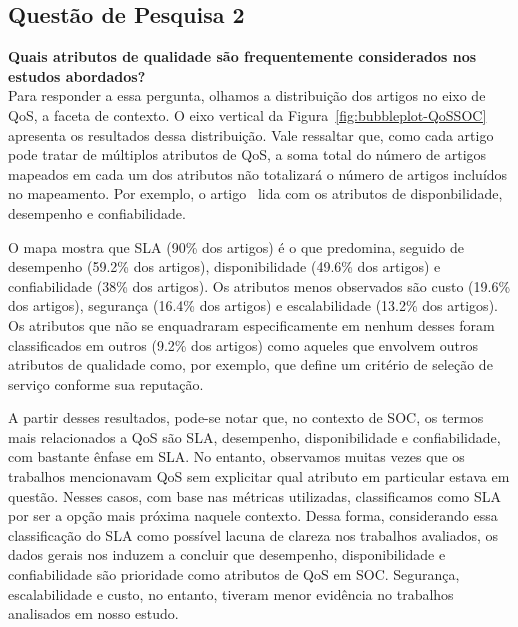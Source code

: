 \subsection{Quest\~{a}o de Pesquisa 2}
\textbf{Quais atributos de qualidade são frequentemente considerados nos estudos abordados?}
\\[0.01in]

Para responder a essa pergunta, olhamos a distribui\c{c}\~{a}o dos artigos no eixo de QoS, a faceta de contexto. O eixo vertical da Figura~\ref{fig:bubbleplot-QoSSOC} apresenta os resultados dessa distribui\c{c}\~{a}o. Vale ressaltar que, como cada artigo pode tratar de m\'{u}ltiplos atributos de QoS, a soma total do n\'{u}mero de artigos mapeados em cada um dos atributos n\~{a}o totalizar\'{a} o n\'{u}mero de artigos inclu\'{i}dos no mapeamento. Por exemplo, o artigo~\cite{DBLP:journals/tse/CalinescuGKMT11} lida com os atributos de disponbilidade, desempenho e confiabilidade. 

O mapa mostra que SLA (90\% dos artigos) \'{e} o que predomina, seguido de desempenho (59.2\% dos artigos), disponibilidade (49.6\% dos artigos) e confiabilidade (38\% dos artigos). Os atributos menos observados s\~{a}o custo (19.6\% dos artigos), seguran\c{c}a (16.4\% dos artigos) e escalabilidade (13.2\% dos artigos). Os atributos que n\~{a}o se enquadraram especificamente em nenhum desses foram classificados em outros (9.2\% dos artigos) como aqueles que envolvem outros atributos de qualidade como, por exemplo, \cite{6036406} que define um crit\'{e}rio de sele\c{c}\~{a}o de servi\c{c}o conforme sua reputa\c{c}\~{a}o. 

A partir desses resultados, pode-se notar que, no contexto de SOC, os termos mais relacionados a QoS s\~{a}o SLA, desempenho, disponibilidade e confiabilidade, com bastante \^{e}nfase em SLA. No entanto, observamos muitas vezes que os trabalhos mencionavam QoS sem explicitar qual atributo em particular estava em quest\~{a}o. Nesses casos, com base nas m\'{e}tricas utilizadas, classificamos como SLA por ser a op\c{c}\~{a}o mais pr\'{o}xima naquele contexto. Dessa forma, considerando essa classifica\c{c}\~{a}o do SLA como poss\'{i}vel lacuna de clareza nos trabalhos avaliados, os dados gerais nos induzem a concluir que desempenho, disponibilidade e confiabilidade s\~{a}o prioridade como atributos de QoS em SOC. Seguran\c{c}a, escalabilidade e custo, no entanto, tiveram menor evid\^{e}ncia no trabalhos analisados em nosso estudo.